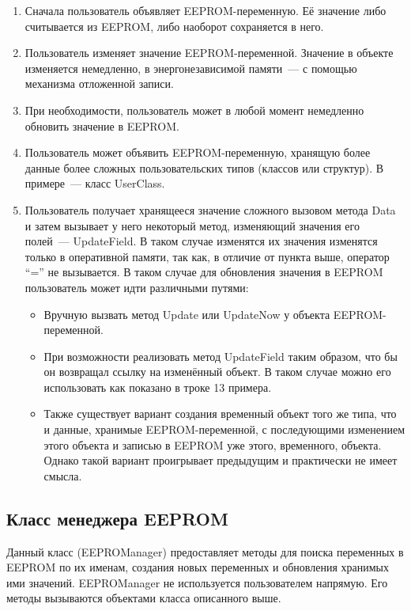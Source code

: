 \begin{enumerate}
	\item Сначала пользователь объявляет EEPROM-переменную.
	Её значение либо считывается из EEPROM, либо наоборот сохраняется в него.
	\item Пользователь изменяет значение EEPROM-переменной. Значение в объекте изменяется немедленно, в энергонезависимой памяти~--- с помощью механизма отложенной записи.
	\item При необходимости, пользователь может в любой момент немедленно обновить значение в EEPROM.
	\item Пользователь может объявить EEPROM-переменную, хранящую более данные более сложных пользовательских типов (классов или структур).
	В примере~--- класс UserClass.
	\item Пользователь получает хранящееся значение сложного вызовом метода Data и затем вызывает у него некоторый метод, изменяющий значения его полей~--- UpdateField.
	В таком случае изменятся их значения изменятся только в оперативной памяти, так как, в отличие от пункта выше, оператор "`="' не вызывается.
	В таком случае для обновления значения в EEPROM пользователь может идти различными путями:
	\begin{itemize}
		\item Вручную вызвать метод Update или UpdateNow у объекта EEPROM-переменной.
		\item При возможности реализовать метод UpdateField таким образом, что бы он возвращал ссылку на изменённый объект.
		В таком случае можно его использовать как показано в троке 13 примера.
		\item Также существует вариант создания временный объект того же типа, что и данные, хранимые EEPROM-переменной, с последующими изменением этого объекта и записью в EEPROM уже этого, временного, объекта.
		Однако такой вариант проигрывает предыдущим и практически не имеет смысла.
	\end{itemize}
\end{enumerate}

\subsection{Класс менеджера EEPROM}

Данный класс (EEPROManager) предоставляет методы для поиска переменных в EEPROM по их именам, создания новых переменных и обновления хранимых ими значений.
EEPROManager не используется пользователем напрямую.
Его методы вызываются объектами класса описанного выше.

